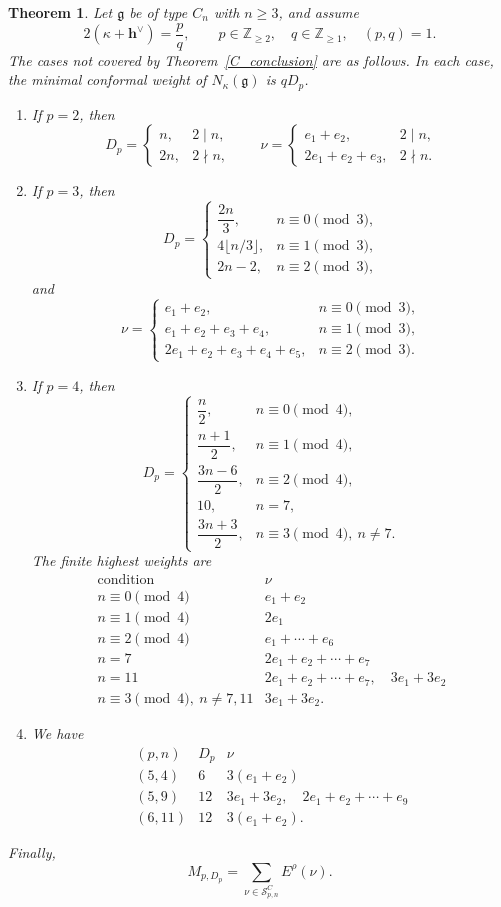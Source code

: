 \documentclass[11pt,a4paper]{amsart}
\newcommand{\ZZ}{\mathbb Z}
\theoremstyle{plain}
\newtheorem{theorem}{Theorem}[section]
\numberwithin{equation}{section}
\begin{document}
\begin{theorem}\label{specialcaseC}
Let $\mathfrak g$ be of type $C_n$ with \(n\ge3\), and assume
\[
2(\kappa+\mathbf{h}^\vee)=\frac pq,
\qquad p\in\ZZ_{\ge2},\quad q\in\ZZ_{\ge1},\quad (p,q)=1.
\]
The cases not covered by Theorem~\ref{C_conclusion} are as follows.
In each case, the minimal conformal weight of
\(N_\kappa(\mathfrak g)\) is \(qD_p\).
\begin{enumerate}
\item If $p=2$, then
\[
D_p=\begin{cases}n,&2\mid n,\\2n,&2\nmid n,\end{cases}
\qquad
\nu=\begin{cases}e_1+e_2,&2\mid n,\\2e_1+e_2+e_3,&2\nmid n.\end{cases}
\]
\item If $p=3$, then
\[
D_p=\begin{cases}
\dfrac{2n}{3},&n\equiv0\pmod3,\\
4\lfloor n/3\rfloor,&n\equiv1\pmod3,\\
2n-2,&n\equiv2\pmod3,
\end{cases}
\]
and
\[
\nu=\begin{cases}
e_1+e_2,&n\equiv0\pmod3,\\
e_1+e_2+e_3+e_4,&n\equiv1\pmod3,\\
2e_1+e_2+e_3+e_4+e_5,&n\equiv2\pmod3.
\end{cases}
\]
\item If $p=4$, then
\[
D_p=\begin{cases}
\dfrac n2,&n\equiv0\pmod4,\\
\dfrac{n+1}{2},&n\equiv1\pmod4,\\
\dfrac{3n-6}{2},&n\equiv2\pmod4,\\
10,&n=7,\\
\dfrac{3n+3}{2},&n\equiv3\pmod4,\ n\ne7.
\end{cases}
\]
The finite highest weights are
\[
\begin{array}{c|l}
\text{condition}&\nu\\ \hline
n\equiv0\pmod4&e_1+e_2\\
n\equiv1\pmod4&2e_1\\
n\equiv2\pmod4&e_1+\cdots+e_6\\
n=7&2e_1+e_2+\cdots+e_7\\
n=11&2e_1+e_2+\cdots+e_7,\quad 3e_1+3e_2\\
n\equiv3\pmod4,\ n\ne7,11&3e_1+3e_2.
\end{array}
\]
\item We have
\[
\begin{array}{c|c|c}
(p,n)&D_p&\nu\\ \hline
(5,4)&6&3(e_1+e_2)\\
(5,9)&12&3e_1+3e_2,\quad 2e_1+e_2+\cdots+e_9\\
(6,11)&12&3(e_1+e_2).
\end{array}
\]
\end{enumerate}
Finally, 
\begin{equation}\label{eq:C-remaining-first-coefficient}
M_{p,D_p}
=\sum_{\nu\in\mathcal S^C_{p,n}}E^\rho(\nu).
\end{equation}
\end{theorem}
\end{document}
